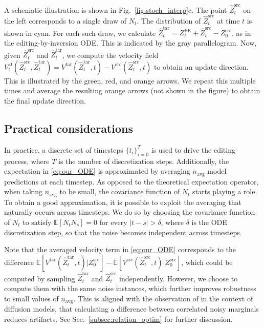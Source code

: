 A schematic illustration is shown in Fig.~\ref{fig:stoch_interp}c. The point $\hat{Z}^{\text{src}}_{t}$ on the left corresponds to a single draw of $N_t$. The distribution of $\hat{Z}^{\text{src}}_{t}$ at time $t$ is shown in cyan. For each such draw, we calculate $\hat{Z}^{\text{tar}}_t=Z^{\text{FE}}_t+\hat{Z}^{\text{src}}_t-Z^{\text{src}}_0$, as in the editing-by-inversion ODE. This is indicated by the gray parallelogram.  Now, given $\hat{Z}^{\text{src}}_{t}$ and $\hat{Z}^{\text{tar}}_t$, we compute the velocity field $V^\Delta_t(\hat{Z}^{\text{src}}_{t},\hat{Z}^{\text{tar}}_t)= V^{\text{tar}}(\hat{Z}^{\text{tar}}_t,t)-V^{\text{src}}(\hat{Z}^{\text{src}}_t,t)$ to obtain an update direction. This is illustrated by the green, red, and orange arrows. We repeat this multiple times and average the resulting orange arrows (not shown in the figure) to obtain the final update direction. 

\subsection{Practical considerations}
\label{sec:pratical}

In practice, a discrete set of timesteps $\{t_i\}^{T}_{i=0}$ is used to drive the editing process, where $T$ is the number of discretization steps. Additionally, the expectation in \eqref{eq:our_ODE} is approximated by averaging $n_{\text{avg}}$ model predictions at each timestep. As opposed to the theoretical expectation operator, when taking $n_{\text{avg}}$ to be small, the covariance function of $N_t$ starts playing a role. To obtain a good approximation, it is possible to exploit the averaging that naturally occurs across timesteps. We do so by choosing the covariance function of $N_t$ to satisfy $\mathbb{E}[N_tN_s]=0$ for every $|t-s|>\delta$, where $\delta$ is the ODE discretization step, so that the noise becomes independent across timesteps.

Note that the averaged velocity term in \eqref{eq:our_ODE} corresponds to the difference
$\mathbb{E}[V^{\text{tar}}(\hat{Z}^{\text{tar}}_t,t) | Z^{\text{src}}_0] - \mathbb{E}[V^{\text{src}}(\hat{Z}^{\text{src}}_t,t) | Z^{\text{src}}_0]$, which could be computed by sampling $\hat{Z}^{\text{tar}}_t$ and $\hat{Z}^{\text{src}}_t$ independently. However, we choose to compute them with the same noise instances, which further improves robustness to small values of $n_{\text{avg}}$. 
This is aligned with the observation of \citet{hertz2023delta} in the context of diffusion models, that calculating a difference between correlated noisy marginals reduces artifacts. See Sec.~\ref{subsec:relation_optim} for further discussion.

